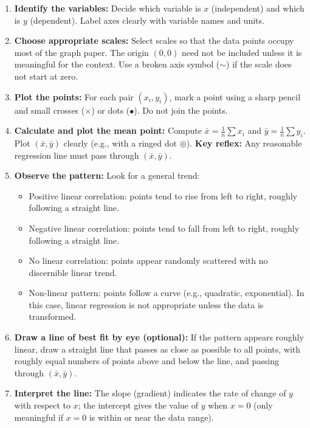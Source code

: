 \documentclass[11pt]{article}
\newcommand{\cle}[1]{{\popxbold\color{popdark}#1}}
\begin{document}
\begin{methode}
\begin{enumerate}
\item \textbf{Identify the variables:} Decide which variable is $x$ (independent) and which is $y$ (dependent). Label axes clearly with variable names and units.
\item \textbf{Choose appropriate scales:} Select scales so that the data points occupy most of the graph paper. The origin $(0,0)$ need not be included unless it is meaningful for the context. Use a broken axis symbol ($\sim$) if the scale does not start at zero.
\item \textbf{Plot the points:} For each pair $(x_i, y_i)$, mark a point using a sharp pencil and small crosses ($\times$) or dots ($\bullet$). Do not join the points.
\item \textbf{Calculate and plot the mean point:} Compute $\bar{x} = \frac{1}{n}\sum x_i$ and $\bar{y} = \frac{1}{n}\sum y_i$. Plot $(\bar{x}, \bar{y})$ clearly (e.g., with a ringed dot $\circledcirc$). \textbf{Key reflex:} Any reasonable regression line must pass through $(\bar{x}, \bar{y})$.
\item \textbf{Observe the pattern:} Look for a general trend:
\begin{itemize}
\item \cle{Positive linear correlation}: points tend to rise from left to right, roughly following a straight line.
\item \cle{Negative linear correlation}: points tend to fall from left to right, roughly following a straight line.
\item \cle{No linear correlation}: points appear randomly scattered with no discernible linear trend.
\item \cle{Non-linear pattern}: points follow a curve (e.g., quadratic, exponential). In this case, linear regression is not appropriate unless the data is transformed.
\end{itemize}
\item \textbf{Draw a line of best fit by eye (optional):} If the pattern appears roughly linear, draw a straight line that passes as close as possible to all points, with roughly equal numbers of points above and below the line, and passing through $(\bar{x}, \bar{y})$.
\item \textbf{Interpret the line:} The slope (gradient) indicates the rate of change of $y$ with respect to $x$; the intercept gives the value of $y$ when $x=0$ (only meaningful if $x=0$ is within or near the data range).
\end{enumerate}
\end{methode}
\end{document}
